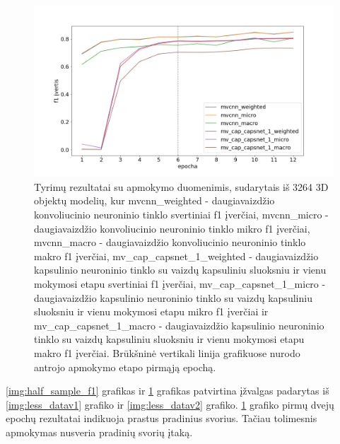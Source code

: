 \begin{figure}[H]
	\centering
	\includegraphics[scale=0.4]{img/3rd_sample_f1.png}
	\caption{
		Tyrimų rezultatai su apmokymo duomenimis, sudarytais iš 3264 3D objektų modelių, kur mvcnn\_weighted -  daugiavaizdžio konvoliucinio neuroninio tinklo svertiniai f1 įverčiai, 
		mvcnn\_micro -  daugiavaizdžio konvoliucinio neuroninio tinklo mikro f1 įverčiai, 
		mvcnn\_macro -  daugiavaizdžio konvoliucinio neuroninio tinklo makro f1 įverčiai, 
		mv\_cap\_capsnet\_1\_weighted - daugiavaizdžio kapsulinio neuroninio tinklo su vaizdų kapsuliniu sluoksniu ir vienu mokymosi etapu svertiniai f1 įverčiai, 
		mv\_cap\_capsnet\_1\_micro - daugiavaizdžio kapsulinio neuroninio tinklo su vaizdų kapsuliniu sluoksniu ir vienu mokymosi etapu mikro f1 įverčiai ir
		mv\_cap\_capsnet\_1\_macro - daugiavaizdžio kapsulinio neuroninio tinklo su vaizdų kapsuliniu sluoksniu ir vienu mokymosi etapu makro f1 įverčiai. Brūkšninė vertikali linija grafikuose nurodo antrojo apmokymo etapo pirmąją epochą.
	}
	\label{img:3rd_sample_f1}
\end{figure}

\ref{img:half_sample_f1} grafikas ir \ref{img:3rd_sample_f1} grafikas patvirtina įžvalgas padarytas iš \ref{img:less_datav1} grafiko ir \ref{img:less_datav2} grafiko. \ref{img:3rd_sample_f1} grafiko pirmų dvejų epochų rezultatai indikuoja prastus pradinius svorius. Tačiau tolimesnis apmokymas nusveria pradinių svorių įtaką.


